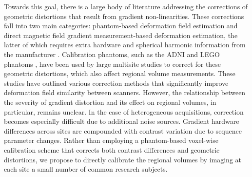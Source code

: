Towards this goal, there is a large body of literature addressing the corrections of geometric distortions that result from gradient non-linearities. These corrections fall into two main categories: phantom-based deformation field estimation and direct magnetic field gradient measurement-based deformation estimation, the latter of which requires extra hardware and spherical harmonic information from the manufacturer \cite{fonov2010improved}. Calibration phantoms, such as the ADNI \cite{gunter2009measurement} and LEGO phantoms \cite{caramanos2010gradient}, have been used by large multisite studies to correct for these geometric distortions, which also affect regional volume measurements. These studies have outlined various correction methods that significantly improve deformation field similarity between scanners. However, the relationship between the severity of gradient distortion and its effect on regional volumes, in particular, remains unclear. In the case of heterogeneous acquisitions, correction becomes especially difficult due to additional noise sources. Gradient hardware differences across sites are compounded with contrast variation due to sequence parameter changes. %
Rather than employing a phantom-based voxel-wise calibration scheme that corrects both contrast differences and geometric distortions, we propose to directly calibrate the regional volumes by imaging at each site a small number of common research subjects.